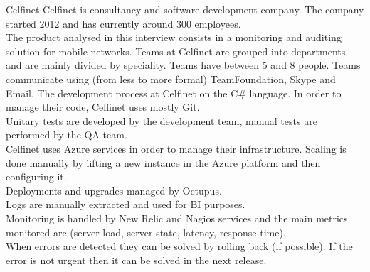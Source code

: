     \begin{companyreport}{Celfinet}
      \product
      Celfinet is consultancy and software development company. The company started 2012 and has currently around 300 employees.\\
      The product analysed in this interview consists in a monitoring and auditing solution for mobile networks.
      \teams
      Teams at Celfinet are grouped into departments and are mainly divided by speciality. Teams have between 5 and 8 people. Teams communicate using (from less to more formal) TeamFoundation, Skype and Email.
      \development
      The development process at Celfinet on the C\# language. In order to manage their code, Celfinet uses mostly Git. \\
      Unitary tests are developed by the development team, manual tests are performed by the QA team.\\
      \operations
      Celfinet uses Azure services in order to manage their infrastructure. Scaling is done manually by lifting a new instance in the Azure platform and then configuring it.\\
      Deployments and upgrades managed by Octupus.\\
      Logs are manually extracted and used for BI purposes.\\
      Monitoring is handled by New Relic and Nagios services and the main metrics monitored are  (server load, server state, latency, response time).\\
      When errors are detected they can be solved by rolling back (if possible). If the error is not urgent then it can be solved in the next release.
      \reportend
    \end{companyreport}

